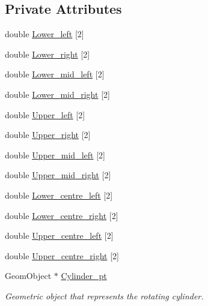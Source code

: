 \subsection*{Private Attributes}
\begin{DoxyCompactItemize}
\item 
double \hyperlink{classCylinderAndInterfaceDomain_a27c21e714221edda1d21995f941e74e3}{Lower\+\_\+left} \mbox{[}2\mbox{]}
\item 
double \hyperlink{classCylinderAndInterfaceDomain_a04206f6c72189356d5eecf32b81595f4}{Lower\+\_\+right} \mbox{[}2\mbox{]}
\item 
double \hyperlink{classCylinderAndInterfaceDomain_a5285785212f1cbcfb3910e87421d831c}{Lower\+\_\+mid\+\_\+left} \mbox{[}2\mbox{]}
\item 
double \hyperlink{classCylinderAndInterfaceDomain_a390ef76333ff22e7331b37ac7d5412bb}{Lower\+\_\+mid\+\_\+right} \mbox{[}2\mbox{]}
\item 
double \hyperlink{classCylinderAndInterfaceDomain_a2ad3d09d983dfcd5cc2a2b4c0d3d8b62}{Upper\+\_\+left} \mbox{[}2\mbox{]}
\item 
double \hyperlink{classCylinderAndInterfaceDomain_a87b1a618cc0116816b5460f00f3875a6}{Upper\+\_\+right} \mbox{[}2\mbox{]}
\item 
double \hyperlink{classCylinderAndInterfaceDomain_a01c924b854c98cb5a45ba2d1af43aa46}{Upper\+\_\+mid\+\_\+left} \mbox{[}2\mbox{]}
\item 
double \hyperlink{classCylinderAndInterfaceDomain_afb8019b28889f581f79541d571fb6386}{Upper\+\_\+mid\+\_\+right} \mbox{[}2\mbox{]}
\item 
double \hyperlink{classCylinderAndInterfaceDomain_a389bb3200199cf6098461f884e1b4d09}{Lower\+\_\+centre\+\_\+left} \mbox{[}2\mbox{]}
\item 
double \hyperlink{classCylinderAndInterfaceDomain_a1f1363c5343672e04be3b9f3285b0a25}{Lower\+\_\+centre\+\_\+right} \mbox{[}2\mbox{]}
\item 
double \hyperlink{classCylinderAndInterfaceDomain_a231d89466e433b65d0a6fd74b29b4609}{Upper\+\_\+centre\+\_\+left} \mbox{[}2\mbox{]}
\item 
double \hyperlink{classCylinderAndInterfaceDomain_a21972e49d0da0a5c1cbb89422b8bcfc3}{Upper\+\_\+centre\+\_\+right} \mbox{[}2\mbox{]}
\item 
Geom\+Object $\ast$ \hyperlink{classCylinderAndInterfaceDomain_aa0afda5d24ea33ff58957731e5b7dfd7}{Cylinder\+\_\+pt}
\begin{DoxyCompactList}\small\item\em Geometric object that represents the rotating cylinder. \end{DoxyCompactList}\end{DoxyCompactItemize}


